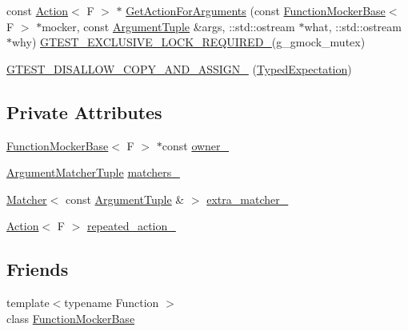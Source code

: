\begin{DoxyCompactItemize}
\item 
const \hyperlink{classtesting_1_1Action}{Action}$<$ F $>$ $\ast$ \hyperlink{classtesting_1_1internal_1_1TypedExpectation_a2e6b527b4de669f66af63be395f0985d}{Get\+Action\+For\+Arguments} (const \hyperlink{classtesting_1_1internal_1_1FunctionMockerBase}{Function\+Mocker\+Base}$<$ F $>$ $\ast$mocker, const \hyperlink{classtesting_1_1internal_1_1TypedExpectation_a9a91379262d101f435809ba4556d14fa}{Argument\+Tuple} \&args, \+::std\+::ostream $\ast$what, \+::std\+::ostream $\ast$why) \hyperlink{gtest-port_8h_a149f693bd59fa1bc937af54c0cdcb32f}{G\+T\+E\+S\+T\+\_\+\+E\+X\+C\+L\+U\+S\+I\+V\+E\+\_\+\+L\+O\+C\+K\+\_\+\+R\+E\+Q\+U\+I\+R\+E\+D\+\_\+}(g\+\_\+gmock\+\_\+mutex)
\item 
\hyperlink{classtesting_1_1internal_1_1TypedExpectation_a1792ee9330d91ee4da36c3f0cb18b88d}{G\+T\+E\+S\+T\+\_\+\+D\+I\+S\+A\+L\+L\+O\+W\+\_\+\+C\+O\+P\+Y\+\_\+\+A\+N\+D\+\_\+\+A\+S\+S\+I\+G\+N\+\_\+} (\hyperlink{classtesting_1_1internal_1_1TypedExpectation}{Typed\+Expectation})
\end{DoxyCompactItemize}
\subsection*{Private Attributes}
\begin{DoxyCompactItemize}
\item 
\hyperlink{classtesting_1_1internal_1_1FunctionMockerBase}{Function\+Mocker\+Base}$<$ F $>$ $\ast$const \hyperlink{classtesting_1_1internal_1_1TypedExpectation_ab31ce65e492f93cb7c8cd676eb64d5fa}{owner\+\_\+}
\item 
\hyperlink{classtesting_1_1internal_1_1TypedExpectation_a8f10e3906761cc5c10fa3561c6e8938e}{Argument\+Matcher\+Tuple} \hyperlink{classtesting_1_1internal_1_1TypedExpectation_a40c442a0e8fffc8bf94611a8130998bf}{matchers\+\_\+}
\item 
\hyperlink{classtesting_1_1Matcher}{Matcher}$<$ const \hyperlink{classtesting_1_1internal_1_1TypedExpectation_a9a91379262d101f435809ba4556d14fa}{Argument\+Tuple} \& $>$ \hyperlink{classtesting_1_1internal_1_1TypedExpectation_a7d2fef3d4429a3a350282e6030a45ba4}{extra\+\_\+matcher\+\_\+}
\item 
\hyperlink{classtesting_1_1Action}{Action}$<$ F $>$ \hyperlink{classtesting_1_1internal_1_1TypedExpectation_ac0ec406bd08a2260ede55650b3e16a62}{repeated\+\_\+action\+\_\+}
\end{DoxyCompactItemize}
\subsection*{Friends}
\begin{DoxyCompactItemize}
\item 
{\footnotesize template$<$typename Function $>$ }\\class \hyperlink{classtesting_1_1internal_1_1TypedExpectation_a1771ea4a3d92d8b2ff0f0aa6fc40ff55}{Function\+Mocker\+Base}
\end{DoxyCompactItemize}
